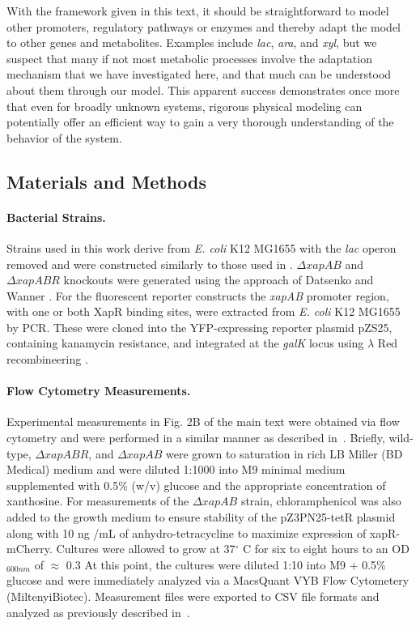 \documentclass[10pt,letterpaper]{article}
\begin{document}
	With the framework given in this text, it
	should be straightforward to model other promoters, regulatory pathways or
	enzymes and thereby adapt the model to other genes and metabolites. Examples
	include \emph{lac}, \emph{ara}, and \emph{xyl}, but we suspect that many if
	not most metabolic processes involve the adaptation mechanism that we have
	investigated here, and that much can be understood about them through our
	model. This apparent success demonstrates once more that even for broadly
	unknown systems, rigorous physical modeling can potentially offer an
	efficient way to gain a very thorough understanding of the behavior of the
	system. 
	
	\subsection*{Materials and Methods}
	\paragraph*{Bacterial Strains.} Strains used in this work
	derive from {\it E. coli} K12 MG1655 with the {\it lac} operon
	removed and were constructed similarly to those used in
	\cite{RazoMejia 2018, Belliveau2019}. $\Delta{xapAB}$ and
	$\Delta{xapABR}$ knockouts were generated using the approach of
	Datsenko and Wanner \cite{Datsenko2000}. For the fluorescent
	reporter constructs the {\it xapAB} promoter region, with one or
	both XapR binding sites, were extracted from {\it E. coli} K12
	MG1655 by PCR. These were cloned into the YFP-expressing reporter
	plasmid pZS25,  containing kanamycin resistance, and integrated at
	the {\it galK} locus using $\lambda$ Red recombineering \cite{Sharan2009}.
	
	\paragraph*{Flow Cytometry Measurements.}
	Experimental measurements in Fig. 2B of the main text were obtained
	via flow cytometry and were performed in a similar manner as
	described in~\cite{RazoMejia2018}. Briefly, wild-type,
	$\Delta{xapABR}$, and $\Delta{xapAB}$ were grown to saturation in
	rich LB Miller (BD Medical) medium and were diluted 1:1000 into M9
	minimal medium supplemented with 0.5\% (w/v) glucose and the
	appropriate concentration of xanthosine. For measurements of the
	$\Delta{xapAB}$ strain, chloramphenicol was also added to the growth
	medium to ensure stability of the pZ3PN25-tetR plasmid along with 10
	ng /mL of anhydro-tetracycline to maximize expression of
	xapR-mCherry. Cultures were allowed to grow at 37$^\circ$ C for six
	to eight hours to an OD$_{600nm}$ of $\approx$ 0.3 At this point,
	the cultures were diluted 1:10 into M9 + 0.5\% glucose and were
	immediately analyzed via a MacsQuant VYB Flow Cytometery
	(MiltenyiBiotec). Measurement files were exported to CSV file
	formats and analyzed as previously described
	in~\cite{RazoMejia2018}.
\end{document}

